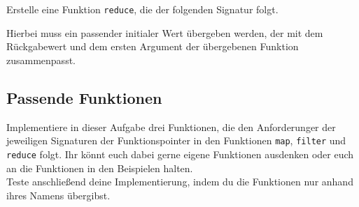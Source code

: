 Erstelle eine Funktion \lstinline{reduce}, die der folgenden Signatur folgt.



Hierbei muss ein passender initialer Wert übergeben werden, der mit dem Rückgabewert und dem ersten Argument der übergebenen Funktion zusammenpasst.

\subsection{Passende Funktionen}
Implementiere in dieser Aufgabe drei Funktionen, die den Anforderunger der jeweiligen Signaturen der Funktionspointer in den Funktionen \lstinline{map}, \lstinline{filter} und \lstinline{reduce} folgt.
Ihr könnt euch dabei gerne eigene Funktionen ausdenken oder euch an die Funktionen in den Beispielen halten. \\

Teste anschließend deine Implementierung, indem du die Funktionen nur anhand ihres Namens übergibst.


